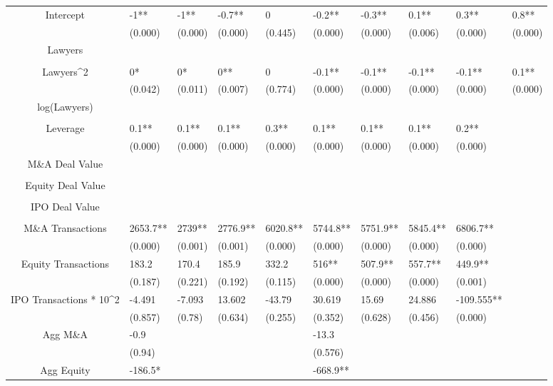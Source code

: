 \documentclass{article}
\begin{document}
\begin{table}[H]
\begin{tabular}{|clllllllll|}
Intercept & -1** & -1** & -0.7** & 0 & -0.2** & -0.3** & 0.1** & 0.3** & 0.8** \\
   & (0.000) & (0.000) & (0.000) & (0.445) & (0.000) & (0.000) & (0.006) & (0.000) & (0.000) \\
  Lawyers &  &  &  &  &  &  &  &  &  \\
   &  &  &  &  &  &  &  &  &  \\
  Lawyers^2 & 0* & 0* & 0** & 0 & -0.1** & -0.1** & -0.1** & -0.1** & 0.1** \\
   & (0.042) & (0.011) & (0.007) & (0.774) & (0.000) & (0.000) & (0.000) & (0.000) & (0.000) \\
  log(Lawyers) &  &  &  &  &  &  &  &  &  \\
   &  &  &  &  &  &  &  &  &  \\
  Leverage & 0.1** & 0.1** & 0.1** & 0.3** & 0.1** & 0.1** & 0.1** & 0.2** &  \\
   & (0.000) & (0.000) & (0.000) & (0.000) & (0.000) & (0.000) & (0.000) & (0.000) &  \\
  M\&A Deal Value &  &  &  &  &  &  &  &  &  \\
   &  &  &  &  &  &  &  &  &  \\
  Equity Deal Value &  &  &  &  &  &  &  &  &  \\
   &  &  &  &  &  &  &  &  &  \\
  IPO Deal Value &  &  &  &  &  &  &  &  &  \\
   &  &  &  &  &  &  &  &  &  \\
  M\&A Transactions & 2653.7** & 2739** & 2776.9** & 6020.8** & 5744.8** & 5751.9** & 5845.4** & 6806.7** &  \\
   & (0.000) & (0.001) & (0.001) & (0.000) & (0.000) & (0.000) & (0.000) & (0.000) &  \\
  Equity Transactions & 183.2 & 170.4 & 185.9 & 332.2 & 516** & 507.9** & 557.7** & 449.9** &  \\
   & (0.187) & (0.221) & (0.192) & (0.115) & (0.000) & (0.000) & (0.000) & (0.001) &  \\
  IPO Transactions * 10^2 & -4.491 & -7.093 & 13.602 & -43.79 & 30.619 & 15.69 & 24.886 & -109.555** &  \\
   & (0.857) & (0.78) & (0.634) & (0.255) & (0.352) & (0.628) & (0.456) & (0.000) &  \\
  Agg M\&A & -0.9 &  &  &  & -13.3 &  &  &  &  \\
   & (0.94) &  &  &  & (0.576) &  &  &  &  \\
  Agg Equity & -186.5* &  &  &  & -668.9** &  &  &  &  \\

\end{tabular}
\end{table}
\end{document}
